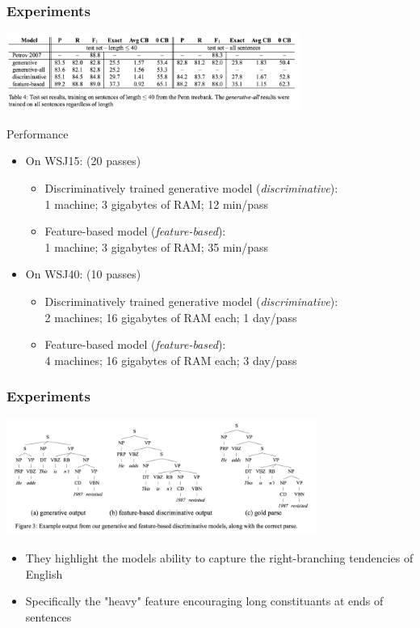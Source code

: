 \documentclass{beamer}
\begin{document}
\begin{frame}
  \frametitle{Experiments}
  \includegraphics[height=1in]{resultsred.png}
  \begin{block}{Performance}
    \begin{itemize}
      \item On WSJ15: (20 passes)
        \begin{itemize}
          \item Discriminatively trained generative model (\textit{discriminative}):  \\
                1 machine; 3 gigabytes of RAM; 12 min/pass
          \item Feature-based model  (\textit{feature-based}):  \\
                1 machine; 3 gigabytes of RAM; 35 min/pass
        \end{itemize}
      \item On WSJ40: (10 passes)
        \begin{itemize}
          \item Discriminatively trained generative model (\textit{discriminative}): \\
                2 machines; 16 gigabytes of RAM each; 1 day/pass
          \item Feature-based model  (\textit{feature-based}):  \\
                4 machines; 16 gigabytes of RAM each; 3 day/pass
        \end{itemize}
    \end{itemize}
  \end{block}
\end{frame}


\begin{frame}
  \frametitle{Experiments}
  \includegraphics[height=1.5in]{trees.png}
  \begin{itemize}
    \item They highlight the models ability to capture the right-branching tendencies of English  \\
    \item Specifically the "heavy" feature encouraging long constituants at ends of sentences
  \end{itemize}
\end{frame}
\end{document}
